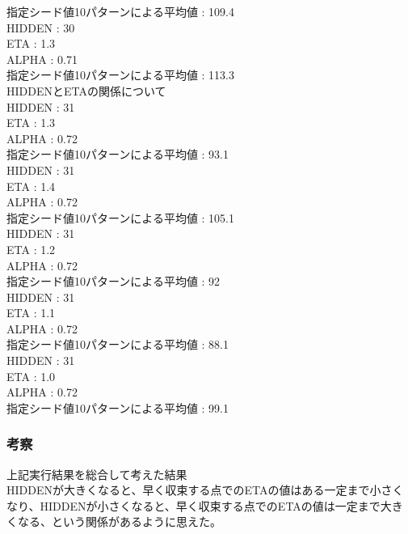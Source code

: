 指定シード値10パターンによる平均値 : 109.4\\


HIDDEN : 30\\
ETA        : 1.3\\
ALPHA   : 0.71\\

指定シード値10パターンによる平均値 : 113.3\\


HIDDENとETAの関係について\\
HIDDEN : 31\\
ETA        : 1.3\\
ALPHA   : 0.72\\

指定シード値10パターンによる平均値 : 93.1\\


HIDDEN : 31\\
ETA        : 1.4\\
ALPHA   : 0.72\\

指定シード値10パターンによる平均値 : 105.1\\


HIDDEN : 31\\
ETA        : 1.2\\
ALPHA   : 0.72\\

指定シード値10パターンによる平均値 : 92\\


HIDDEN : 31\\
ETA        : 1.1\\
ALPHA   : 0.72\\

指定シード値10パターンによる平均値 : 88.1\\


HIDDEN : 31\\
ETA        : 1.0\\
ALPHA   : 0.72\\

指定シード値10パターンによる平均値 : 99.1\\

\subsubsection{考察}
上記実行結果を総合して考えた結果\\
HIDDENが大きくなると、早く収束する点でのETAの値はある一定まで小さくなり、HIDDENが小さくなると、早く収束する点でのETAの値は一定まで大きくなる、という関係があるように思えた。




